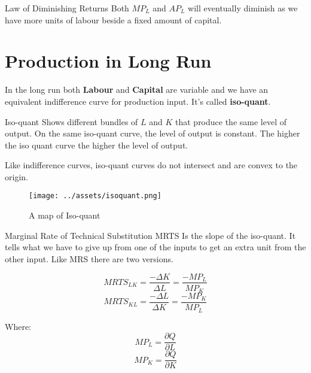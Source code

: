 \documentclass[../ECON-281-Notes.tex]{subfiles}
\begin{document}
\begin{Theorem}
    {Law of Diminishing Returns}
    Both \(MP_L\) and \(AP_L\) will eventually diminish as we have more units of labour beside a fixed amount of capital. 
\end{Theorem}

\section{Production in Long Run}
In the long run both \textbf{Labour} and \textbf{Capital} are variable and we have an equivalent indifference curve for production input. It's called \textbf{iso-quant}.

\begin{Definition}
    {Iso-quant}
    Shows different bundles of \(L\) and \(K\) that produce the same level of output.
    On the same iso-quant curve, the level of output is constant. The higher the iso quant curve the higher the level of output.

    Like indifference curves, iso-quant curves do not intersect and are convex to the origin. 
\end{Definition}
\begin{figure}[!h]
    \centering
    \texttt{[image: ../assets/isoquant.png]}
    \caption{A map of Iso-quant}
    \label{fig:isoquant}
\end{figure}

\begin{Definition}
    {Marginal Rate of Technical Substitution MRTS}
    Is the slope of the iso-quant. It tells what we have to give up from one of the inputs to get an extra unit from the other input. Like MRS there are two versions. 

    \begin{equation}
        MRTS_{LK} = \frac{-\Delta K}{\Delta L} = \frac{-MP_L}{MP_K}
    \end{equation}
    \begin{equation}
        MRTS_{KL} = \frac{-\Delta L}{\Delta K} = \frac{-MP_K}{MP_L}
    \end{equation}
    
    Where:
    \begin{equation}
        MP_L = \frac{\partial Q}{\partial L}   
    \end{equation}
    \begin{equation}
        MP_K = \frac{\partial Q}{\partial K}
    \end{equation}
\end{Definition}
\end{document}

